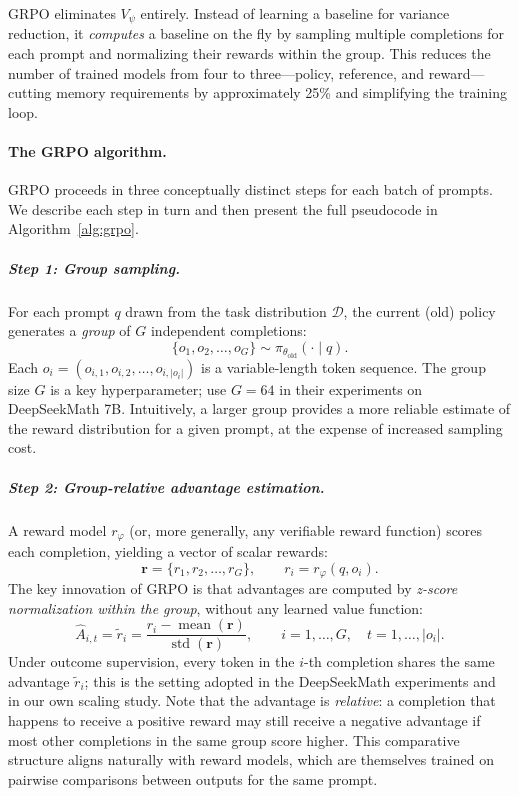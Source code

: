 \noindent
GRPO eliminates $V_\psi$ entirely.  Instead of learning a baseline for
variance reduction, it \emph{computes} a baseline on the fly by sampling
multiple completions for each prompt and normalizing their rewards
within the group.  This reduces the number of trained models from four to
three---policy, reference, and reward---cutting memory requirements by
approximately 25\% and simplifying the training loop.

\paragraph{The GRPO algorithm.}
GRPO proceeds in three conceptually distinct steps for each batch of
prompts.  We describe each step in turn and then present the full
pseudocode in Algorithm~\ref{alg:grpo}.

\subparagraph{Step 1: Group sampling.}
For each prompt $q$ drawn from the task distribution $\mathcal{D}$, the
current (old) policy generates a \emph{group} of $G$ independent
completions:
\begin{equation}
\label{eq:grpo-sampling}
\{o_1, o_2, \ldots, o_G\} \sim \pi_{\theta_{\text{old}}}(\cdot \mid q).
\end{equation}
Each $o_i = (o_{i,1}, o_{i,2}, \ldots, o_{i,|o_i|})$ is a variable-length
token sequence.  The group size $G$ is a key hyperparameter;
\cite{shao2024deepseekmath} use $G = 64$ in their experiments on
DeepSeekMath 7B.  Intuitively, a larger group provides a more reliable
estimate of the reward distribution for a given prompt, at the expense of
increased sampling cost.

\subparagraph{Step 2: Group-relative advantage estimation.}
A reward model $r_\varphi$ (or, more generally, any verifiable reward
function) scores each completion, yielding a vector of scalar rewards:
\begin{equation}
\label{eq:grpo-rewards}
\mathbf{r} = \{r_1, r_2, \ldots, r_G\},
\qquad r_i = r_\varphi(q, o_i).
\end{equation}
The key innovation of GRPO is that advantages are computed by
\emph{z-score normalization within the group}, without any learned value
function:
\begin{equation}
\label{eq:grpo-advantage}
\boxed{
\hat{A}_{i,t} = \tilde{r}_i
  = \frac{r_i - \operatorname{mean}(\mathbf{r})}
         {\operatorname{std}(\mathbf{r})},
\qquad i = 1, \ldots, G,
\quad t = 1, \ldots, |o_i|.}
\end{equation}
Under outcome supervision, every token in the $i$-th completion shares the
same advantage $\tilde{r}_i$; this is the setting adopted in the
DeepSeekMath experiments and in our own scaling study.  Note that the
advantage is \emph{relative}: a completion that happens to receive a
positive reward may still receive a negative advantage if most other
completions in the same group score higher.  This comparative structure
aligns naturally with reward models, which are themselves trained on
pairwise comparisons between outputs for the same prompt.

